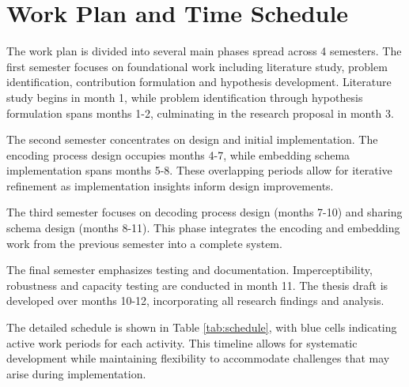 \documentclass{ittelkom}
\begin{document}



\section{Work Plan and Time Schedule}
The work plan is divided into several main phases spread across 4 semesters.
The first semester focuses on foundational work including literature study,
problem identification, contribution formulation and hypothesis development.
Literature study begins in month 1, while problem identification through
hypothesis formulation spans months 1-2, culminating in the research proposal
in month 3.

The second semester concentrates on design and initial implementation. The
encoding process design occupies months 4-7, while embedding schema
implementation spans months 5-8. These overlapping periods allow for iterative
refinement as implementation insights inform design improvements.

The third semester focuses on decoding process design (months 7-10) and sharing
schema design (months 8-11). This phase integrates the encoding and embedding
work from the previous semester into a complete system.

The final semester emphasizes testing and documentation. Imperceptibility,
robustness and capacity testing are conducted in month 11. The thesis draft is
developed over months 10-12, incorporating all research findings and analysis.

The detailed schedule is shown in Table \ref{tab:schedule}, with blue cells
indicating active work periods for each activity. This timeline allows for
systematic development while maintaining flexibility to accommodate challenges
that may arise during implementation.
\end{document}

